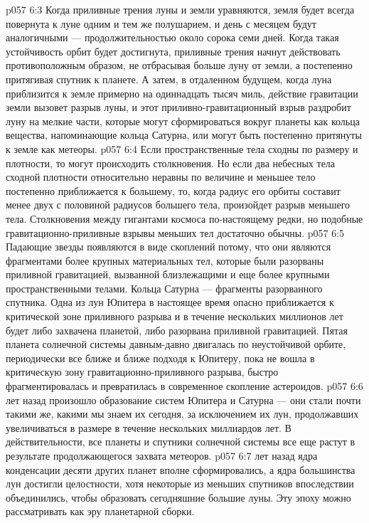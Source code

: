 \vs p057 6:3 Когда приливные трения луны и земли уравняются, земля будет всегда повернута к луне одним и тем же полушарием, и день с месяцем будут аналогичными --- продолжительностью около сорока семи дней. Когда такая устойчивость орбит будет достигнута, приливные трения начнут действовать противоположным образом, не отбрасывая больше луну от земли, а постепенно притягивая спутник к планете. А затем, в отдаленном будущем, когда луна приблизится к земле примерно на одиннадцать тысяч миль, действие гравитации земли вызовет разрыв луны, и этот приливно\hyp{}гравитационный взрыв раздробит луну на мелкие части, которые могут сформироваться вокруг планеты как кольца вещества, напоминающие кольца Сатурна, или могут быть постепенно притянуты к земле как метеоры.
\vs p057 6:4 Если пространственные тела сходны по размеру и плотности, то могут происходить столкновения. Но если два небесных тела сходной плотности относительно неравны по величине и меньшее тело постепенно приближается к большему, то, когда радиус его орбиты составит менее двух с половиной радиусов большего тела, произойдет разрыв меньшего тела. Столкновения между гигантами космоса по\hyp{}настоящему редки, но подобные гравитационно\hyp{}приливные взрывы меньших тел достаточно обычны.
\vs p057 6:5 Падающие звезды появляются в виде скоплений потому, что они являются фрагментами более крупных материальных тел, которые были разорваны приливной гравитацией, вызванной близлежащими и еще более крупными пространственными телами. Кольца Сатурна --- фрагменты разорванного спутника. Одна из лун Юпитера в настоящее время опасно приближается к критической зоне приливного разрыва и в течение нескольких миллионов лет будет либо захвачена планетой, либо разорвана приливной гравитацией. Пятая планета солнечной системы давным\hyp{}давно двигалась по неустойчивой орбите, периодически все ближе и ближе подходя к Юпитеру, пока не вошла в критическую зону гравитационно\hyp{}приливного разрыва, быстро фрагментировалась и превратилась в современное скопление астероидов.
\vs p057 6:6 \pc {} лет назад произошло образование систем Юпитера и Сатурна --- они стали почти такими же, какими мы знаем их сегодня, за исключением их лун, продолжавших увеличиваться в размере в течение нескольких миллиардов лет. В действительности, все планеты и спутники солнечной системы все еще растут в результате продолжающегося захвата метеоров.
\vs p057 6:7 \pc {} лет назад ядра конденсации десяти других планет вполне сформировались, а ядра большинства лун достигли целостности, хотя некоторые из меньших спутников впоследствии объединились, чтобы образовать сегодняшние большие луны. Эту эпоху можно рассматривать как эру планетарной сборки.
